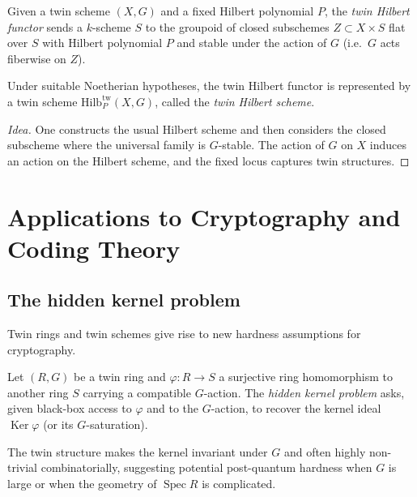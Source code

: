 \documentclass[11pt,a4paper]{article}
\numberwithin{equation}{section}
\DeclareMathOperator{\Spec}{Spec}
\DeclareMathOperator{\Ker}{Ker}
\begin{document}
	\begin{definition}
		Given a twin scheme $(X,G)$ and a fixed Hilbert polynomial $P$, the \emph{twin Hilbert functor} sends a $k$-scheme $S$
		to the groupoid of closed subschemes $Z\subset X\times S$ flat over $S$ with Hilbert polynomial $P$ and stable under the
		action of $G$ (i.e.\ $G$ acts fiberwise on $Z$).
	\end{definition}
	
	\begin{theorem}
		Under suitable Noetherian hypotheses, the twin Hilbert functor is represented by a twin scheme 
		$\mathrm{Hilb}^{\mathrm{tw}}_P(X,G)$, called the \emph{twin Hilbert scheme}.
	\end{theorem}
	
	\begin{proof}[Idea]
		One constructs the usual Hilbert scheme and then considers the closed subscheme where 
		the universal family is $G$-stable.
		The action of $G$ on $X$ induces an action on the Hilbert scheme, and the fixed locus 
		captures twin structures.
	\end{proof}
	
	\section{Applications to Cryptography and Coding Theory}
	\label{sec:crypto}
	
	\subsection{The hidden kernel problem}
	
	Twin rings and twin schemes give rise to new hardness assumptions for cryptography.
	
	\begin{definition}
		Let $(R,G)$ be a twin ring and $\varphi:R\to S$ a surjective ring homomorphism to another ring $S$
		carrying a compatible $G$-action. The \emph{hidden kernel problem} asks, given black-box access to $\varphi$
		and to the $G$-action, to recover the kernel ideal $\Ker\varphi$ (or its $G$-saturation).
	\end{definition}
	
	\begin{remark}
		The twin structure makes the kernel invariant under $G$ and often highly non-trivial combinatorially,
		suggesting potential post-quantum hardness when $G$ is large or when the geometry of $\Spec R$ is complicated.
	\end{remark}
	
\end{document}
